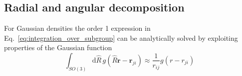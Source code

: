 \subsection{Radial and angular decomposition}
%
For Gaussian densities the order 1 expression in Eq.~\ref{eq:integration_over_subgroup} can be analytically solved by exploiting properties of the Gaussian function\cite{musil2019machine}
\begin{equation}
  \label{eq:order1_analytical_solution}
  \int_{SO(3)} \mathrm{d}\hat{R}\, g(\hat{R}\mathbf{r}-\mathbf{r}_{ji}) %
  \approx \frac{1}{r_{ij}}g(r-r_{ji})
\end{equation}
